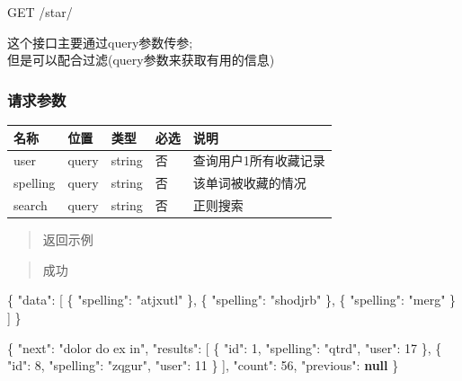 \documentclass[
]{article}
\newenvironment{Shaded}{}{}
\newcommand{\DataTypeTok}[1]{\textcolor[rgb]{0.56,0.13,0.00}{#1}}
\newcommand{\DecValTok}[1]{\textcolor[rgb]{0.25,0.63,0.44}{#1}}
\newcommand{\FunctionTok}[1]{\textcolor[rgb]{0.02,0.16,0.49}{#1}}
\newcommand{\KeywordTok}[1]{\textcolor[rgb]{0.00,0.44,0.13}{\textbf{#1}}}
\newcommand{\OtherTok}[1]{\textcolor[rgb]{0.00,0.44,0.13}{#1}}
\newcommand{\StringTok}[1]{\textcolor[rgb]{0.25,0.44,0.63}{#1}}
\begin{document}
GET /star/

这个接口主要通过query参数传参;\\
但是可以配合过滤(query参数来获取有用的信息)

\hypertarget{ux8bf7ux6c42ux53c2ux6570-31}{%
\subsubsection{请求参数}\label{ux8bf7ux6c42ux53c2ux6570-31}}

\begin{longtable}[]{@{}lllll@{}}
\toprule
名称 & 位置 & 类型 & 必选 & 说明 \\
\midrule
\endhead
user & query & string & 否 & 查询用户1所有收藏记录 \\
spelling & query & string & 否 & 该单词被收藏的情况 \\
search & query & string & 否 & 正则搜索 \\
\bottomrule
\end{longtable}

\begin{quote}
返回示例
\end{quote}

\begin{quote}
成功
\end{quote}

\begin{Shaded}
\begin{Highlighting}[]
\FunctionTok{\{}
  \DataTypeTok{"data"}\FunctionTok{:} \OtherTok{[}
    \FunctionTok{\{}
      \DataTypeTok{"spelling"}\FunctionTok{:} \StringTok{"atjxutl"}
    \FunctionTok{\}}\OtherTok{,}
    \FunctionTok{\{}
      \DataTypeTok{"spelling"}\FunctionTok{:} \StringTok{"shodjrb"}
    \FunctionTok{\}}\OtherTok{,}
    \FunctionTok{\{}
      \DataTypeTok{"spelling"}\FunctionTok{:} \StringTok{"merg"}
    \FunctionTok{\}}
  \OtherTok{]}
\FunctionTok{\}}
\end{Highlighting}
\end{Shaded}

\begin{Shaded}
\begin{Highlighting}[]
\FunctionTok{\{}
  \DataTypeTok{"next"}\FunctionTok{:} \StringTok{"dolor do ex in"}\FunctionTok{,}
  \DataTypeTok{"results"}\FunctionTok{:} \OtherTok{[}
    \FunctionTok{\{}
      \DataTypeTok{"id"}\FunctionTok{:} \DecValTok{1}\FunctionTok{,}
      \DataTypeTok{"spelling"}\FunctionTok{:} \StringTok{"qtrd"}\FunctionTok{,}
      \DataTypeTok{"user"}\FunctionTok{:} \DecValTok{17}
    \FunctionTok{\}}\OtherTok{,}
    \FunctionTok{\{}
      \DataTypeTok{"id"}\FunctionTok{:} \DecValTok{8}\FunctionTok{,}
      \DataTypeTok{"spelling"}\FunctionTok{:} \StringTok{"zqgur"}\FunctionTok{,}
      \DataTypeTok{"user"}\FunctionTok{:} \DecValTok{11}
    \FunctionTok{\}}
  \OtherTok{]}\FunctionTok{,}
  \DataTypeTok{"count"}\FunctionTok{:} \DecValTok{56}\FunctionTok{,}
  \DataTypeTok{"previous"}\FunctionTok{:} \KeywordTok{null}
\FunctionTok{\}}
\end{Highlighting}
\end{Shaded}
\end{document}
